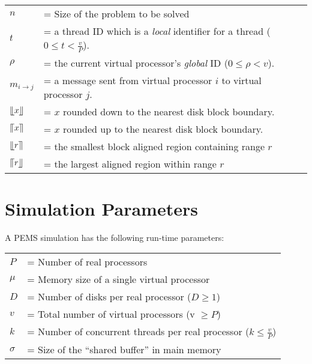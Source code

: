 \documentclass[12pt]{carletoncsthesis}
\begin{document}
\begin{center}
\begin{tabular}[ht]{ll}
$n$ & = Size of the problem to be solved \\

$t$ & = a thread ID which is a {\em local} identifier for a thread
($0 \le t < \frac{v}{P}$). \\

$\rho$ & = the current virtual processor's {\em global} ID ($0 \le \rho < v$). \\

$m_{i \rightarrow j}$ & = a message sent from virtual processor $i$ to
virtual processor $j$. \\

$\llfloor{x}\rrfloor$ & = $x$ rounded down to the nearest disk block boundary. \\

$\llceil{x}\rrceil$ & = $x$ rounded up to the nearest disk block boundary. \\

$\llfloor{r}\rrceil$ & = the smallest block aligned region containing range $r$ \\

$\llceil{r}\rrfloor$ & = the largest aligned region within range $r$ \\

\end{tabular}
\end{center}

\section{Simulation Parameters}


A PEMS simulation has the following run-time parameters:

\begin{center}
\begin{tabular}[ht]{ll}
$P$      & = Number of real processors \\
$\mu$    & = Memory size of a single virtual processor \\
$D$      & = Number of disks per real processor ($D \geq 1$) \\
$v$      & = Total number of virtual processors (v $\geq P$) \\
$k$      & = Number of concurrent threads per real processor ($k \leq \frac{v}{P}$) \\
$\sigma$ & = Size of the ``shared buffer'' in main memory
\end{tabular}
\end{center}
\end{document}
